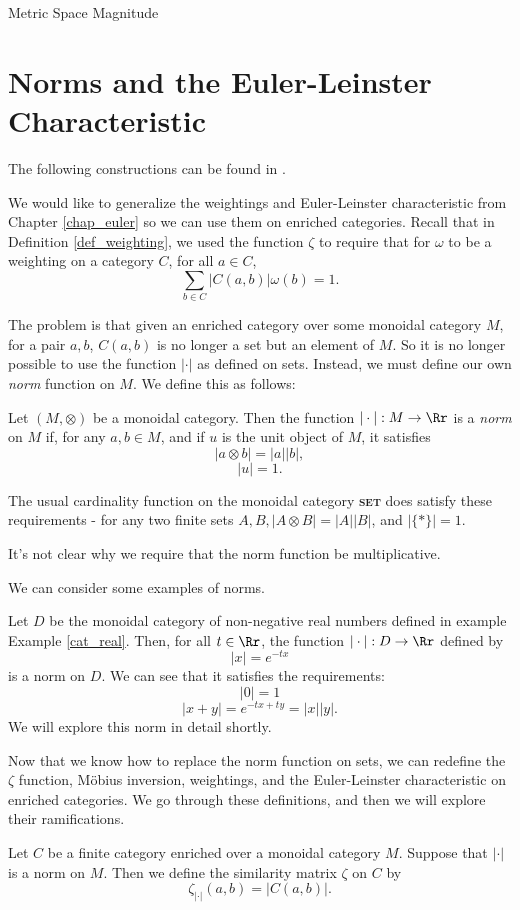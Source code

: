 \documentclass[12pt]{pom_thesis}
\newcommand{\catname}[1]{\textbf{\textsc{#1}}}
\begin{document}
\begin{chapter}{Metric Space Magnitude}
\section{Norms and the Euler-Leinster Characteristic}
The following constructions can be found in \cite{Lein4}.

We would like to generalize the weightings and Euler-Leinster characteristic from Chapter \ref{chap_euler} so we can use them on enriched categories. Recall that in Definition \ref{def_weighting}, we used the function $\zeta$ to require that for $\omega$ to be a weighting on a category $C$, for all $a \in C$,
\[
\sum_{b \in C}|C(a,b)|\omega(b) = 1.
\]

The problem is that given an enriched category over some monoidal category $M$, for a pair $a,b$, $C(a,b)$ is no longer a set but an element of $M$. So it is no longer possible to use the function $|\cdot|$ as defined on sets. Instead, we must define our own \emph{norm} function on $M$. We define this as follows:
\begin{defn}
Let $(M,\otimes)$ be a monoidal category. Then the function $| \cdot |: M \rightarrow \Rr$ is a \emph{norm} on $M$ if, for any $a,b\in M$, and if $u$ is the unit object of $M$, it satisfies
\[
|a \otimes b| = |a||b|,
\]
\[
|u| = 1.
\]
\end{defn}

The usual cardinality function on the monoidal category \catname{set} does satisfy these requirements - for any two finite sets $A,B, |A \otimes B| = |A||B|$, and $|\{*\}|=1$.

It's not clear why we require that the norm function be multiplicative. %

We can consider some examples of norms.
\begin{examp}\label{exp_norm}
Let $D$ be the monoidal category of non-negative real numbers defined in example Example \ref{cat_real}. Then, for all $t \in \Rr$, the function $|\cdot|:D \rightarrow \Rr$ defined by 
\[
|x| = e^{-tx}
\]
is a norm on $D$. We can see that it satisfies the requirements:
\[|0| = 1
\]
\[|x + y| = e^{-tx + ty} = |x||y|.
\]
We will explore this norm in detail shortly.
\end{examp}

Now that we know how to replace the norm function on sets, we can redefine the $\zeta$ function, M\"obius inversion, weightings, and the Euler-Leinster characteristic on enriched categories. We go through these definitions, and then we will explore their ramifications.
\begin{defn}
Let $C$ be a finite category enriched over a monoidal category $M$. Suppose that $|\cdot|$ is a norm on $M$. Then we define the similarity matrix $\zeta$ on $C$ by
\[
\zeta_{|\cdot|}(a,b) = |C(a,b)|.
\]
\end{defn}


\end{chapter}
\end{document}
